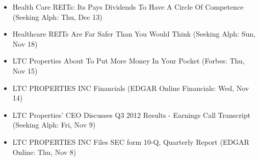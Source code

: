 \documentclass[11pt,asymmetric]{article}
\begin{document}
\begin{itemize}
\item Health Care REITs: Its Pays Dividends To Have A Circle Of Competence (Seeking Alph: Thu, Dec 13)
\item Healthcare REITs Are Far Safer Than You Would Think (Seeking Alph: Sun, Nov 18)
\item LTC Properties About To Put More Money In Your Pocket (Forbes: Thu, Nov 15)
\item LTC PROPERTIES INC Financials (EDGAR Online Financials: Wed, Nov 14)
\item LTC Properties' CEO Discusses Q3 2012 Results - Earnings Call Transcript (Seeking Alph: Fri, Nov 9)
\item LTC PROPERTIES INC Files SEC form 10-Q, Quarterly Report (EDGAR Online: Thu, Nov 8)
\end{itemize}
\end{document}

